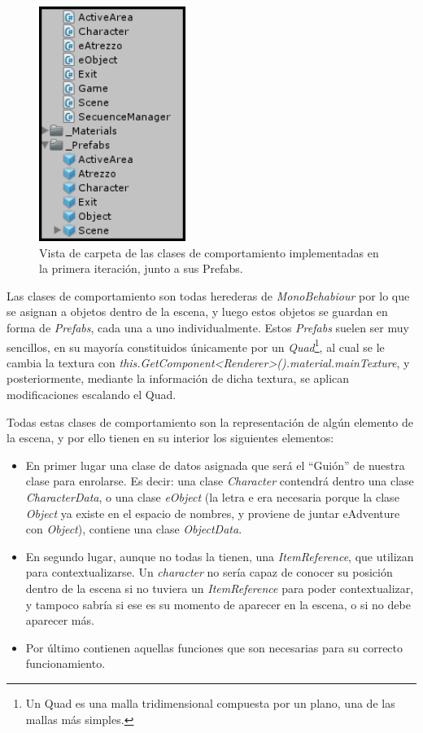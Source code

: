 \begin{figure}[htb]
	\includegraphics[height=3in]{figures/it1/behaviourclasses.png}
	\caption[Clases de Comportamiento - Prototipo 1]{Vista de carpeta de las clases de comportamiento implementadas en la primera iteración, junto a sus Prefabs.}
	\label{dataclassesit1}
\end{figure}

Las clases de comportamiento son todas herederas de \textit{MonoBehabiour} por lo que se asignan a objetos dentro de la escena, y luego estos objetos se guardan en forma de \textit{Prefabs}, cada una a uno individualmente. Estos \textit{Prefabs} suelen ser muy sencillos, en su mayoría constituidos únicamente por un \textit{Quad}\footnote{Un Quad es una malla tridimensional compuesta por un plano, una de las mallas más simples.}, al cual se le cambia la textura con \textit{this.GetComponent<Renderer>().material.mainTexture}, y posteriormente, mediante la información de dicha textura, se aplican modificaciones escalando el Quad. 

Todas estas clases de comportamiento son la representación de algún elemento de la escena, y por ello tienen en su interior los siguientes elementos:

\begin{itemize}
	\item En primer lugar una clase de datos asignada que será el “Guión” de nuestra clase para enrolarse. Es decir: una clase \textit{Character} contendrá dentro una clase \textit{CharacterData}, o una clase \textit{eObject} (la letra e era necesaria porque la clase \textit{Object} ya existe en el espacio de nombres, y proviene de juntar eAdventure con \textit{Object}), contiene una clase \textit{ObjectData}.
	
	\item En segundo lugar, aunque no todas la tienen, una \textit{ItemReference}, que utilizan para contextualizarse. Un \textit{character} no sería capaz de conocer su posición dentro de la escena si no tuviera un \textit{ItemReference} para poder contextualizar, y tampoco sabría si ese es su momento de aparecer en la escena, o si no debe aparecer más.
	
	\item Por último contienen aquellas funciones que son necesarias para su correcto funcionamiento.
\end{itemize}

